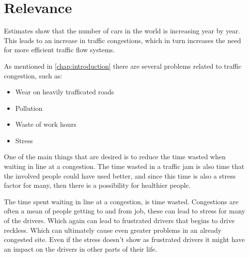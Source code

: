 \section{Relevance}
Estimates show that the number of cars in the world is increasing year by year\cite{WardsAuto:CarPopulation}. This leads to an increase in traffic congestions, which in turn increases the need for more efficient traffic flow systems.

As mentioned in \ref{chap:introduction} there are several problems related to traffic congestion, such as:
\begin{itemize}
	\item Wear on heavily trafficated roads
	\item Pollution
	\item Waste of work hours
	\item Stress
\end{itemize}

One of the main things that are desired is to reduce the time wasted when waiting in line at a congestion.
The time wasted in a traffic jam is also time that the involved people could have used better, and since this time is also a stress factor for many, then there is a possibility for healthier people.

The time spent waiting in line at a congestion, is time wasted. Congestions are often a mean of people getting to and from job, these can lead to stress for many of the drivers. Which again can lead to frustrated drivers that begins to drive reckless. Which can ultimately cause even greater problems in an already congested site. Even if the stress doesn't show as frustrated drivers it might have an impact on the drivers in other parts of their life.

